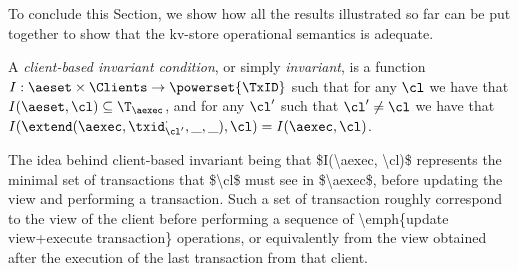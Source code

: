 To conclude this Section, we show how all the results illustrated so far 
can be put together to show that the kv-store operational semantics is adequate. 
\begin{definition}
A \emph{client-based invariant condition}, or simply \emph{invariant}, is a 
function $I : \aeset \times \Clients \rightarrow \powerset{\TxID}$ 
such that for any $\cl$ we have that $I(\aeset, \cl) \subseteq \T_{\aexec}$, and 
for any  $\cl'$ such that $\cl' \neq \cl$ we have that 
$I(\extend(\aexec, \txid_{\cl'}^{\cdot}, \_, \_), \cl) = I(\aexec, \cl)$.
\end{definition}
\ac{The idea behind client-based invariant being that $I(\aexec, \cl)$ represents 
the minimal set of transactions that $\cl$ must see in $\aexec$, before 
updating the view and performing a transaction. Such a set of transaction 
roughly correspond to the view of the client before performing a 
sequence of \emph{update view+execute transaction} operations, 
or equivalently from the view obtained after the execution of the 
last transaction from that client.}


